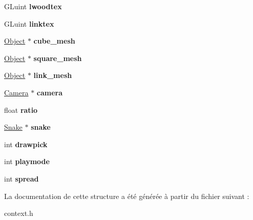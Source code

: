 \begin{DoxyCompactItemize}
\item 
\hypertarget{structcontext_aa45e7b7997c62546548ac4e7bd30596f}{G\-Luint {\bfseries lwoodtex}}\label{structcontext_aa45e7b7997c62546548ac4e7bd30596f}

\item 
\hypertarget{structcontext_a59dfeb5188fc2b445cdeade60e01bc86}{G\-Luint {\bfseries linktex}}\label{structcontext_a59dfeb5188fc2b445cdeade60e01bc86}

\item 
\hypertarget{structcontext_aa74c93f4d7a096e690dd12621a484b34}{\hyperlink{structobject}{Object} $\ast$ {\bfseries cube\-\_\-mesh}}\label{structcontext_aa74c93f4d7a096e690dd12621a484b34}

\item 
\hypertarget{structcontext_a3779ff94a6fe22ae4949d8303eea0c26}{\hyperlink{structobject}{Object} $\ast$ {\bfseries square\-\_\-mesh}}\label{structcontext_a3779ff94a6fe22ae4949d8303eea0c26}

\item 
\hypertarget{structcontext_add9abf88773799f63b6b61aa3b95a8e3}{\hyperlink{structobject}{Object} $\ast$ {\bfseries link\-\_\-mesh}}\label{structcontext_add9abf88773799f63b6b61aa3b95a8e3}

\item 
\hypertarget{structcontext_af95833c961e5bd20dcd54e1d46a03c0b}{\hyperlink{structcamera}{Camera} $\ast$ {\bfseries camera}}\label{structcontext_af95833c961e5bd20dcd54e1d46a03c0b}

\item 
\hypertarget{structcontext_a207ad05f99cc72068a92358861ff5e71}{float {\bfseries ratio}}\label{structcontext_a207ad05f99cc72068a92358861ff5e71}

\item 
\hypertarget{structcontext_a408cd599ea288e5b692809edb69e65c2}{\hyperlink{struct_snake}{Snake} $\ast$ {\bfseries snake}}\label{structcontext_a408cd599ea288e5b692809edb69e65c2}

\item 
\hypertarget{structcontext_a3d99a9e2fdae8652db4aa612f8d9cd96}{int {\bfseries drawpick}}\label{structcontext_a3d99a9e2fdae8652db4aa612f8d9cd96}

\item 
\hypertarget{structcontext_aa49a4684df5eedf20a5c1589e381b00e}{int {\bfseries playmode}}\label{structcontext_aa49a4684df5eedf20a5c1589e381b00e}

\item 
\hypertarget{structcontext_a9fcb2da8648b09e9271722def1ad799a}{int {\bfseries spread}}\label{structcontext_a9fcb2da8648b09e9271722def1ad799a}

\end{DoxyCompactItemize}


La documentation de cette structure a été générée à partir du fichier suivant \-:\begin{DoxyCompactItemize}
\item 
context.\-h\end{DoxyCompactItemize}
